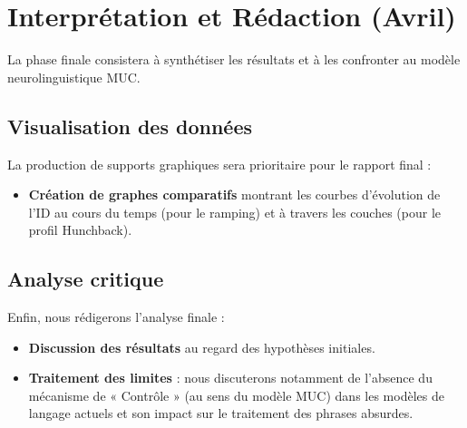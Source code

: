 \section{Interprétation et Rédaction (Avril)}

La phase finale consistera à synthétiser les résultats et à les confronter au modèle neurolinguistique MUC.

\subsection{Visualisation des données}
La production de supports graphiques sera prioritaire pour le rapport final :
\begin{itemize}
    \item \textbf{Création de graphes comparatifs} montrant les courbes d'évolution de l'ID au cours du temps (pour le ramping) et à travers les couches (pour le profil Hunchback).
\end{itemize}

\subsection{Analyse critique}
Enfin, nous rédigerons l'analyse finale :
\begin{itemize}
    \item \textbf{Discussion des résultats} au regard des hypothèses initiales.
    \item \textbf{Traitement des limites} : nous discuterons notamment de l'absence du mécanisme de « Contrôle » (au sens du modèle MUC) dans les modèles de langage actuels et son impact sur le traitement des phrases absurdes.
\end{itemize}